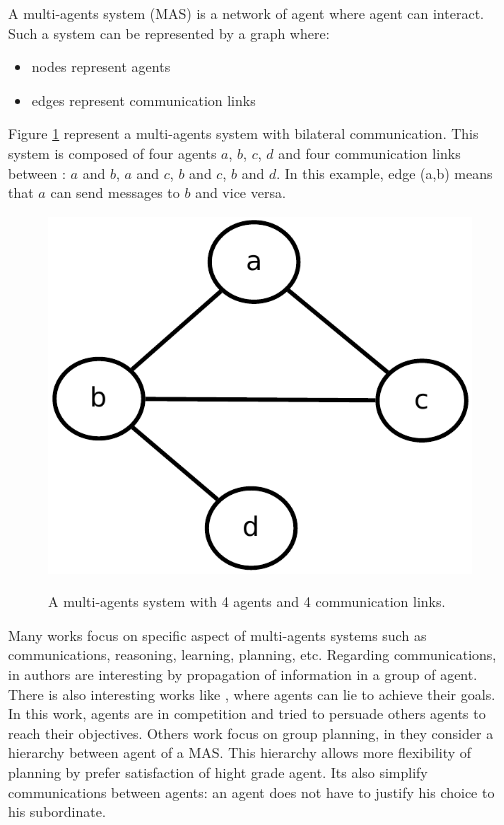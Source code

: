 \documentclass{aamas2012}
\begin{document}
	\begin{definition}
		A multi-agents system (MAS) is a network of agent where agent can interact.
		Such a system can be represented by a graph where:
		\begin{itemize}
			\item nodes represent agents
			\item edges represent communication links
		\end{itemize}
	\end{definition}
	
	Figure \ref{MAS_graph} represent a multi-agents system with bilateral communication.
	This system is composed of four agents $a$, $b$, $c$, $d$ and four communication links between : $a$ and $b$, $a$ and $c$, $b$ and $c$, $b$ and $d$. 
	In this example, edge (a,b) means that $a$ can send messages to $b$ and vice versa.
	
	\begin{figure}
		\centering
		\includegraphics[keepaspectratio=true,scale=0.4]{MAS_graph.pdf}
		\label{MAS_graph}
		\caption{A multi-agents system with 4 agents and 4 communication links.}
	\end{figure}

	Many works focus on specific aspect of multi-agents systems such as communications, reasoning, learning, planning, etc.
	Regarding communications, in \cite{DBLP:conf/ecai/BourgneIM10, DBLP:conf/lads/BourgneIM10} authors are interesting 
	by propagation of information in a group of agent.
	There is also interesting works like \cite{DBLP:conf/ijcai/SakamaSP11}, where agents can lie to achieve their goals.
	In this work, agents are in competition and tried to persuade others agents to reach their objectives.
	Others work focus on group planning, in \cite{DBLP:conf/clima/NieuwenborghVHV06} they consider a hierarchy between agent of a MAS.
	This hierarchy allows more flexibility of planning by prefer satisfaction of hight grade agent.
	Its also simplify communications between agents: an agent does not have to justify his choice to his subordinate.
\end{document}
